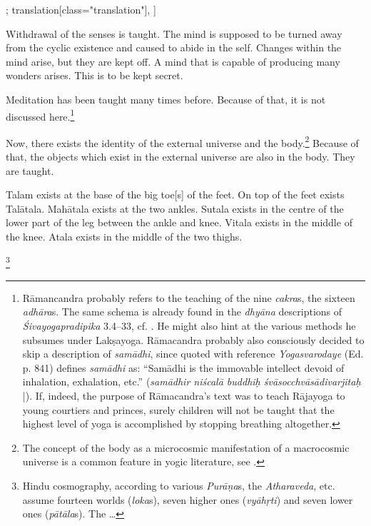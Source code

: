 \begin{alignment}[
  texts=edition[class="edition"];
  translation[class="translation"],
  ]
\begin{translation}
\begin{tlate}[p31_02]
      Withdrawal of the senses is taught. The mind is supposed to be turned away from the cyclic existence and caused to abide in the self. Changes within the mind arise, but they are kept off. A mind that is capable of producing many wonders arises. This is to be kept secret.
      
Meditation has been taught many times before. Because of that, it is not discussed here.\footnote{Rāmancandra probably refers to the teaching of the nine \textit{cakra}s, the sixteen \textit{adhāra}s. The same schema is already found in the \textit{dhyāna} descriptions of \textit{Śivayogapradipika} 3.4–33, cf. \citeauthor[2023: pp. 165,212-215]{shivayogapradipika}. He might also hint at the various methods he subsumes under Lakṣayoga. Rāmacandra probably also consciously decided to skip a description of \textit{samādhi}, since  quoted with reference \textit{Yogasvarodaye} (Ed. p. 841) defines \textit{samādhi} as: ``Samādhi is the immovable intellect devoid of inhalation, exhalation, etc.'' (\textit{samādhir niścalā buddhiḥ śvāsocchvāsādivarjitaḥ} |). If, indeed, the purpose of Rāmacandra's text was to teach Rājayoga to young courtiers and princes, surely children will not be taught that the highest level of yoga is accomplished by stopping breathing altogether.}
\end{tlate}
  \begin{tlate}[p32_01]
Now, there exists the identity of the external universe and the body.\footnote{The concept of the body as a microcosmic manifestation of a macrocosmic universe is a common feature in yogic literature, see \citeauthor[2017:174-178]{rootsofyoga2017}.} Because of that, the objects which exist in the external universe are also in the body. They are taught.

Talam exists at the base of the big toe[s] of the feet. On top of the feet exists Talātala. Mahātala exists at the two ankles. Sutala exists in the centre of the lower part of the leg between the ankle and knee. Vitala exists in the middle of the knee. Atala exists in the middle of the two thighs.\begin{buber}[f32_1]\footnote{Hindu cosmography, according to various \textit{Purāṇa}s, the \textit{Atharaveda}, etc. assume fourteen worlds (\textit{loka}s), seven higher ones (\textit{vyāhṛti}) and seven lower ones (\textit{pātāla}s). The \ldots}\end{buber}
   \end{tlate}
  \end{translation}
\end{alignment}
